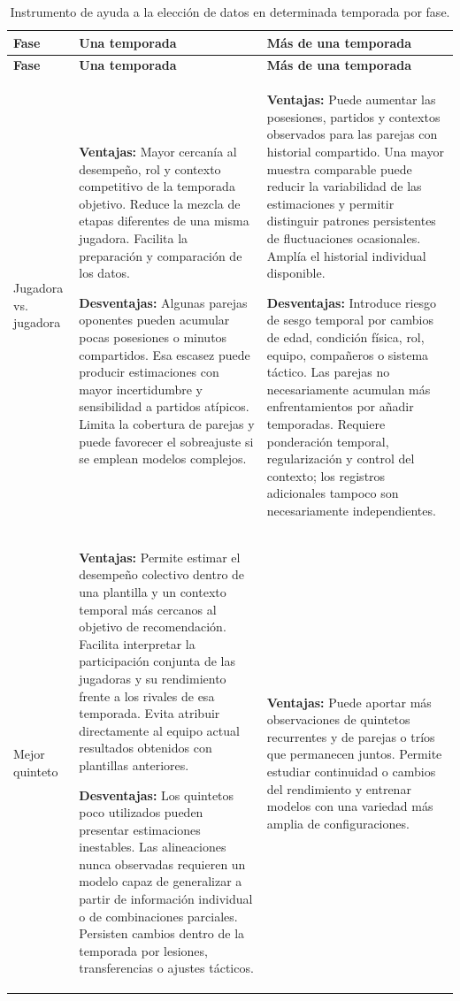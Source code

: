 \begin{longtable}{@{}p{2.15cm}p{5.35cm}p{5.35cm}@{}}
\caption{Instrumento de ayuda a la elección de datos en determinada temporada por fase.}\\
\toprule
\textbf{Fase}&\textbf{Una temporada}&\textbf{Más de una temporada}\\\midrule\endfirsthead
\toprule\textbf{Fase}&\textbf{Una temporada}&\textbf{Más de una temporada}\\\midrule\endhead
Jugadora vs. jugadora&
\textbf{Ventajas:} Mayor cercanía al desempeño, rol y contexto competitivo de la temporada objetivo. Reduce la mezcla de etapas diferentes de una misma jugadora. Facilita la preparación y comparación de los datos.

\textbf{Desventajas:} Algunas parejas oponentes pueden acumular pocas posesiones o minutos compartidos. Esa escasez puede producir estimaciones con mayor incertidumbre y sensibilidad a partidos atípicos. Limita la cobertura de parejas y puede favorecer el sobreajuste si se emplean modelos complejos.&
\textbf{Ventajas:} Puede aumentar las posesiones, partidos y contextos observados para las parejas con historial compartido. Una mayor muestra comparable puede reducir la variabilidad de las estimaciones y permitir distinguir patrones persistentes de fluctuaciones ocasionales. Amplía el historial individual disponible.

\textbf{Desventajas:} Introduce riesgo de sesgo temporal por cambios de edad, condición física, rol, equipo, compañeros o sistema táctico. Las parejas no necesariamente acumulan más enfrentamientos por añadir temporadas. Requiere ponderación temporal, regularización y control del contexto; los registros adicionales tampoco son necesariamente independientes.\\\midrule
Mejor quinteto&
\textbf{Ventajas:} Permite estimar el desempeño colectivo dentro de una plantilla y un contexto temporal más cercanos al objetivo de recomendación. Facilita interpretar la participación conjunta de las jugadoras y su rendimiento frente a los rivales de esa temporada. Evita atribuir directamente al equipo actual resultados obtenidos con plantillas anteriores.

\textbf{Desventajas:} Los quintetos poco utilizados pueden presentar estimaciones inestables. Las alineaciones nunca observadas requieren un modelo capaz de generalizar a partir de información individual o de combinaciones parciales. Persisten cambios dentro de la temporada por lesiones, transferencias o ajustes tácticos.&
\textbf{Ventajas:} Puede aportar más observaciones de quintetos recurrentes y de parejas o tríos que permanecen juntos. Permite estudiar continuidad o cambios del rendimiento y entrenar modelos con una variedad más amplia de configuraciones.


\end{longtable}
